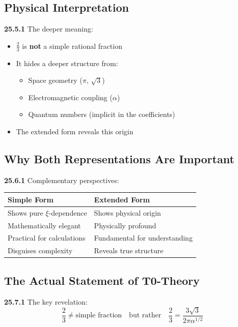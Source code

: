 \subsection{Physical Interpretation}

\noindent \textbf{25.5.1} The deeper meaning:
\begin{itemize}
	\item $\frac{2}{3}$ is \textbf{not} a simple rational fraction
	\item It hides a deeper structure from:
	\begin{itemize}
		\item Space geometry ($\pi$, $\sqrt{3}$)
		\item Electromagnetic coupling ($\alpha$)
		\item Quantum numbers (implicit in the coefficients)
	\end{itemize}
	\item The extended form reveals this origin
\end{itemize}

\subsection{Why Both Representations Are Important}

\noindent \textbf{25.6.1} Complementary perspectives:

\begin{tabular}{p{}p{}}
	\textbf{Simple Form} & \textbf{Extended Form} \\
	\hline
	Shows pure $\xi$-dependence & Shows physical origin \\
	Mathematically elegant & Physically profound \\
	Practical for calculations & Fundamental for understanding \\
	Disguises complexity & Reveals true structure \\
\end{tabular}

\subsection{The Actual Statement of T0-Theory}

\noindent \textbf{25.7.1} The key revelation:
\[
\boxed{
	\frac{2}{3} \neq \text{simple fraction} \quad \text{but rather} \quad \frac{2}{3} = \frac{3\sqrt{3}}{2\pi\alpha^{1/2}}
}
\]

